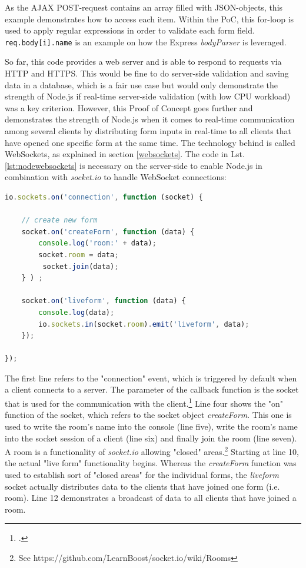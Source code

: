 As the AJAX POST-request contains an array filled with JSON-objects, this
example demonstrates how to access each item. Within the PoC, this
for-loop is used to apply regular expressions in order to validate each form
field. \texttt{req.body[i].name} is an example on how the Express \textit{bodyParser} is leveraged.

So far, this code provides a web server and is able to respond to requests via HTTP and HTTPS. This would be fine to do server-side validation and saving data in a database, which is a fair use case but would only demonstrate the strength of Node.js if real-time server-side validation (with low CPU workload) was a key criterion. However, this Proof of Concept goes further and demonstrates the strength of Node.js when it comes to real-time communication among several clients by distributing form inputs in real-time to all clients that have opened one specific form at the same time. The technology behind is called WebSockets, as explained in section \ref{websockets}. The code in Lst.  \ref{lst:nodewebsockets} is necessary on the server-side to enable Node.js in combination with \textit{socket.io} to handle WebSocket connections:

\begin{lstlisting}[float,
language=javascript,
caption={Using WebSockets to distribute form inputs in real-time},
label=lst:nodewebsockets]
io.sockets.on('connection', function (socket) {

    // create new form
    socket.on('createForm', function (data) {
        console.log('room:' + data);
        socket.room = data;
         socket.join(data);
    } ) ;

    socket.on('liveform', function (data) {
        console.log(data);
        io.sockets.in(socket.room).emit('liveform', data);
    });

});
\end{lstlisting}

The first line refers to the "connection" event, which is triggered by default when a client connects to a server. The parameter of the callback function is the socket that is used for the communication with the client.\footcite[Cf.][197]{Roden_2012} Line four shows the "on" function of the socket, which refers to the socket object \textit{createForm}. This one is used to write the room's name into the console (line five), write the room's name into the socket session of a client (line six) and finally join the room (line seven). A room is a functionality of \textit{socket.io} allowing "closed" areas.\footnote{See https://github.com/LearnBoost/socket.io/wiki/Rooms} Starting at line 10, the actual "live form" functionality begins. Whereas the \textit{createForm} function was used to establish sort of "closed areas" for the individual forms, the \textit{liveform} socket actually distributes data to the clients that have joined one form (i.e. room). Line 12 demonstrates a broadcast of data to all clients that have joined a room.

